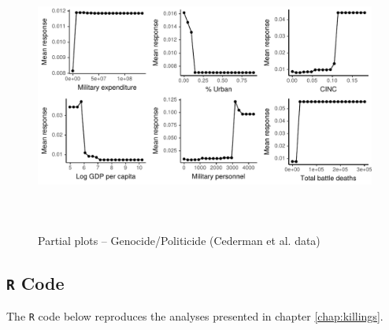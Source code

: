 \begin{figure}[H]
    \centering
    \includegraphics[width=\textwidth, height=9cm]{images/drfdpp7a.pdf}
    \caption{Partial plots -- Genocide/Politicide (Cederman et al. data)}
    \label{fig:my_label}
\end{figure}

\newpage

\subsection{\texttt{R} Code}
\label{sec:mk-code}

The \texttt{R} code below reproduces the analyses presented in chapter \ref{chap:killings}.

